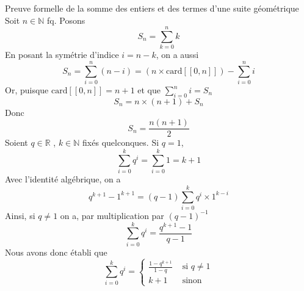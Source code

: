 \documentclass{article}
\date{17 avril 2024}
\begin{document}
\maketitle


\begin{question_kholle}{Preuve formelle de la somme des entiers et des termes d'une suite géométrique} 
    Soit $n \in \mathbb{N}$ fq. Posons $$S_{n} = \sum_{k=0}^{n}k$$
    En posant la symétrie d'indice $i = n-k$, on a aussi
    $$
    S_{n}= \sum_{i=0}^{n}(n-i)=(n \times \mathrm{card}[ \! [ 0, n ] \!]) - \sum_{i=0}^{n} i
    $$
    Or, puisque $\mathrm{card}[ \! [ 0, n ] \!] = n + 1$ et que $\sum_{i=0}^{n} i = S_{n}$
    $$
    S_{n} = n \times (n+1) + S_{n}
    $$
    Donc
    $$
    S_{n} = \frac{n(n+1)}{2}
    $$
    Soient $q \in \mathbb{R}$ , $k \in \mathbb{N}$ fixés quelconques.
    Si $q = 1$, 
    $$
    \sum_{i=0}^{k}q^{i} = \sum_{i=0}^{k}1 = k+1
    $$
    Avec l'identité algébrique, on a
    $$
    q^{k+1}-1^{k+1} = (q-1) \sum_{i=0}^{k}q^{i}\times 1^{k-i}
    $$
    Ainsi, si $q \neq 1$ on a, par multiplication par $(q-1)^{-1}$
    $$
    \sum_{i=0}^{k}q^{i} = \frac{q^{k+1}-1}{q-1}
    $$
    Nous avons donc établi que
    $$
    \sum_{i=0}^{k} q^{i} = \left\{ \begin{array}{ll}
        \frac{1-q^{k+1}}{1-q}  &\text{ si } q \neq 1 \\
        k + 1 &\text{ sinon}
    \end{array}\right.
    $$
\end{question_kholle}
\end{document}
